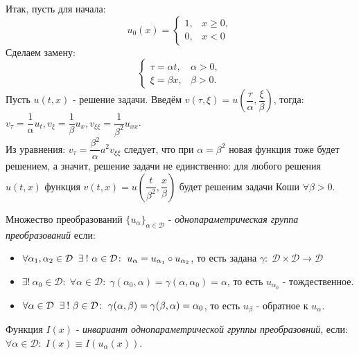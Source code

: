 \documentclass[../main.tex]{subfiles}
\begin{document}
Итак, пусть для начала:
\begin{equation*}
u_0(x) = \begin{cases} 
	1, &x \geq 0, \\
	0, &x < 0 
\end{cases} 
\end{equation*}
Сделаем замену: 
\begin{equation*}
\begin{cases}
	\tau = \alpha t, &\alpha > 0, \\
	\xi = \beta x, &\beta > 0.
\end{cases}
\end{equation*}
Пусть $u(t, x)$ - решение задачи. Введём $v(\tau, \xi) = u\left(\dfrac{\tau}{\alpha}, \dfrac{\xi}{\beta}\right)$, тогда: $v_\tau = \dfrac{1}{\alpha}u_t, v_{\xi} = \dfrac{1}{\beta}u_x, v_{\xi \xi} = \dfrac{1}{\beta^2}u_{xx}$. \\
Из уравнения: $v_{\tau} = \dfrac{\beta^2}{\alpha}a^2v_{\xi \xi}$ следует, что при $\alpha = \beta^2$ новая функция тоже будет решением, а значит, решение задачи не единственно: для любого решения $u(t, x)$ функция $v(t, x) = u\left(\dfrac{t}{\beta^2}, \dfrac{x}{\beta}\right)$ будет решеним задачи Коши $\forall \beta > 0$.
\begin{definition} 
	Множество преобразований $\{u_{\alpha}\}_{\alpha \in \mathcal{D}}$ - \textit{однопараметрическая группа преобразований} если:
	\begin{itemize}
	\item $\forall \alpha_1, \alpha_2 \in \mathcal{D} \;\;\exists\: !~ \alpha \in \mathcal{D}\colon\; u_{\alpha} = u_{\alpha_1} \circ u_{\alpha_2}$, то есть задана $\gamma\colon\; \mathcal{D} \times \mathcal{D} \to \mathcal{D}$
	\item $\exists ! ~\alpha_{0} \in \mathcal{D}\colon\; \forall \alpha \in \mathcal{D}\colon\; \gamma(\alpha_0, \alpha) = \gamma(\alpha, \alpha_0) = \alpha$, то есть $u_{\alpha_0}$ - тождественное.
	\item $\forall \alpha \in \mathcal{D}\;\;\exists\: !~ \beta \in \mathcal{D}\colon\; \gamma(\alpha, \beta) = \gamma(\beta, \alpha) = \alpha_0$, то есть $u_{\beta}$ - обратное к $u_{\alpha}$.
\end{itemize}
\end{definition}
\begin{definition}
Функция $I(x)$ - \textit{инвариант однопараметрической группы преобразовний}, если: $\forall \alpha \in \mathcal{D}\colon\; I(x) \equiv I(u_{\alpha}(x))$.
\end{definition}
\end{document}
